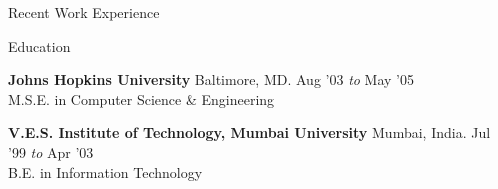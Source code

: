 \documentclass{resume} %
\begin{document}
\begin{rSection}{Recent Work Experience}


\end{rSection}



\begin{rSection}{Education}

{\bf Johns Hopkins University} \hfill Baltimore, MD. Aug '03 {\em to} May '05 \\ 
M.S.E. in Computer Science \& Engineering


{\bf V.E.S. Institute of Technology, Mumbai University} \hfill Mumbai, India. Jul '99 {\em to} Apr '03 \\ 
B.E. in Information Technology

\end{rSection}





\end{document}
